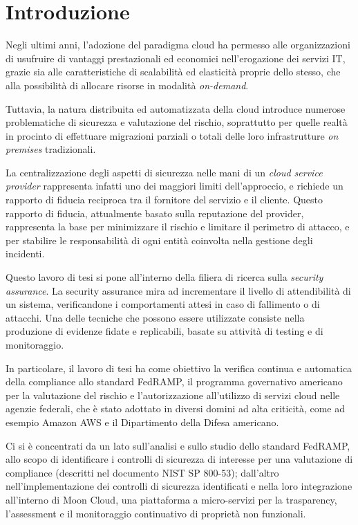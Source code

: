 \documentclass[../main.tex]{subfiles}
\begin{document}
\chapter*{Introduzione}

Negli ultimi anni, l'adozione del paradigma cloud ha permesso alle organizzazioni di usufruire di vantaggi prestazionali ed economici nell'erogazione dei servizi IT, grazie sia alle caratteristiche di scalabilità ed elasticità proprie dello stesso, che alla possibilità di allocare risorse in modalità \textit{on-demand}.


Tuttavia, la natura distribuita ed automatizzata della cloud introduce numerose problematiche di sicurezza e valutazione del rischio, soprattutto per quelle realtà in procinto di effettuare migrazioni parziali o totali delle loro infrastrutture \emph{on premises} tradizionali.


La centralizzazione degli aspetti di sicurezza nelle mani di un \textit{cloud service provider} rappresenta infatti uno dei maggiori limiti dell'approccio, e richiede un rapporto di fiducia reciproca tra il fornitore del servizio e il cliente. Questo rapporto di fiducia, attualmente basato sulla reputazione del provider, rappresenta la base per minimizzare il rischio e limitare il perimetro di attacco, e per stabilire le responsabilità di ogni entità coinvolta nella gestione degli incidenti.


Questo lavoro di tesi si pone all'interno della filiera di ricerca sulla \textit{security assurance}.
La security assurance mira ad incrementare il livello di attendibilità di un sistema, verificandone i comportamenti attesi in caso di fallimento o di attacchi.
Una delle tecniche che possono essere utilizzate consiste nella produzione di evidenze fidate e replicabili, basate su attività di testing e di monitoraggio.


In particolare, il lavoro di tesi ha come obiettivo la verifica continua e automatica della compliance allo standard FedRAMP, il programma governativo americano per la valutazione del rischio e l'autorizzazione all'utilizzo di servizi cloud nelle agenzie federali, che è stato adottato in diversi domini ad alta criticità, come ad esempio Amazon AWS e il Dipartimento della Difesa americano.

Ci si è concentrati da un lato sull'analisi e sullo studio dello standard FedRAMP, allo scopo di identificare i controlli di sicurezza di interesse per una valutazione di compliance (descritti nel documento NIST SP 800-53); dall'altro nell'implementazione dei controlli di sicurezza identificati e nella loro integrazione all'interno di Moon Cloud, una piattaforma a micro-servizi per la trasparency, l'assessment e il monitoraggio continuativo di proprietà non funzionali.
\end{document}

